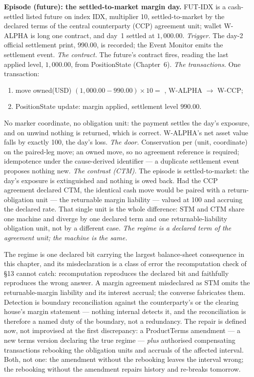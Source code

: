 \medskip\noindent\textbf{Episode (future): the settled-to-market margin day.}
FUT-IDX is a cash-settled listed future on index IDX, multiplier 10,
settled-to-market by the declared terms of the central counterparty (CCP)
agreement unit; wallet W-ALPHA is long one contract, and day~1 settled at
$1{,}000.00$.
\emph{Trigger.} The day-2 official settlement print, $990.00$, is recorded;
the Event Monitor emits the settlement event.
\emph{The contract.} The future's contract fires, reading the last applied
level, $1{,}000.00$, from PositionState (Chapter~6).
\emph{The transactions.} One transaction:
\begin{enumerate}[label=(\arabic*),nosep]
\item move owned(USD) $(1{,}000.00-990.00)\times 10 = $ , W-ALPHA
$\to$ W-CCP;
\item PositionState update: margin applied, settlement level $990.00$.
\end{enumerate}
No marker coordinate, no obligation unit: the payment settles the day's
exposure, and on unwind nothing is returned, which is correct. W-ALPHA's net
asset value falls by exactly 100, the day's loss.
\emph{The door.} Conservation per (unit, coordinate) on the paired-leg move;
an owned move, so no agreement reference is required; idempotence under the
cause-derived identifier --- a duplicate settlement event proposes nothing
new.
\emph{The contrast (CTM).} The episode is settled-to-market: the day's exposure is
extinguished and nothing is owed back. Had the CCP agreement declared CTM, the
identical cash move would be paired with a return-obligation unit --- the returnable
margin liability --- valued at 100 and accruing the declared rate. That single unit is
the whole difference: STM and CTM share one machine and diverge by one declared term
and one returnable-liability obligation unit, not by a different case.
\emph{The regime is a declared term of the agreement unit; the machine is the
same.}

\medskip
The regime is one declared bit carrying the largest balance-sheet consequence
in this chapter, and its misdeclaration is a class of error the recomputation
check of \S13 cannot catch: recomputation reproduces the declared bit and
faithfully reproduces the wrong answer. A margin agreement misdeclared as STM
omits the returnable-margin liability and its interest accrual; the converse
fabricates them. Detection is boundary reconciliation against the
counterparty's or the clearing house's margin statement --- nothing internal
detects it, and the reconciliation is therefore a named duty of the boundary,
not a redundancy. The repair is defined now, not improvised at the first
discrepancy: a ProductTerms amendment --- a new terms version declaring the
true regime --- \emph{plus} authorised compensating transactions rebooking the obligation
units and accruals of the affected interval. Both, not one: the amendment
without the rebooking leaves the interval wrong; the rebooking without the
amendment repairs history and re-breaks tomorrow.


